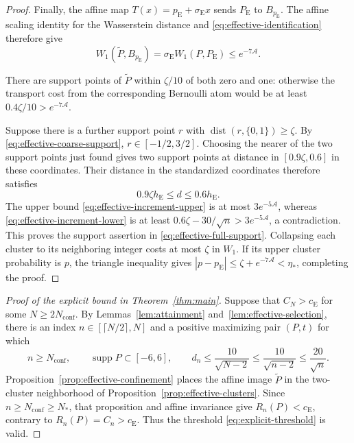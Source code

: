 \documentclass[aop]{imsart}
\theoremstyle{plain}
\theoremstyle{definition}
\theoremstyle{definition}
\newcommand{\ce}{c_{\mathrm E}}
\newcommand{\pe}{p_{\mathrm E}}
\newcommand{\se}{\sigma_{\mathrm E}}
\newcommand{\Pe}{P_{\mathrm E}}
\DeclareMathOperator{\supp}{supp}
\DeclareMathOperator{\dist}{dist}
\begin{document}
\begin{proof}
Finally, the affine map $T(x)=\pe+\se x$ sends $\Pe$ to
$B_{\pe}$.  The affine scaling identity for the Wasserstein distance
and \eqref{eq:effective-identification} therefore give
\[
 W_1(\widetilde P,B_{\pe})
 =\se W_1(P,\Pe)\le e^{-7\mathcal A}.
\]

There are support points of $\widetilde P$ within $\zeta/10$
of both zero and one: otherwise the transport cost from the
corresponding Bernoulli atom would be at least
$0.4\zeta/10>e^{-7\mathcal A}$.

Suppose there is a further support point $r$ with
$\dist(r,\{0,1\})\ge\zeta$.
By \eqref{eq:effective-coarse-support}, $r\in[-1/2,3/2]$.
Choosing the nearer of the two support points just found gives
two support points at distance in $[0.9\zeta,0.6]$ in these
coordinates.  Their distance in the standardized coordinates
therefore satisfies
\[
 0.9\zeta h_{\mathrm E}\le d\le0.6h_{\mathrm E}.
\]
The upper bound \eqref{eq:effective-increment-upper} is at most
$3e^{-5\mathcal A}$, whereas
\eqref{eq:effective-increment-lower} is at least
$0.6\zeta-30/\sqrt n>3e^{-5\mathcal A}$, a contradiction.
This proves the support assertion in
\eqref{eq:effective-full-support}.
Collapsing each cluster to its neighboring integer costs at most
$\zeta$ in $W_1$.  If its upper cluster probability is $p$,
the triangle inequality gives
$|p-\pe|\le\zeta+e^{-7\mathcal A}<\eta_*$, completing the proof.
\end{proof}

\begin{proof}[Proof of the explicit bound in Theorem~\ref{thm:main}]
Suppose that $C_N>\ce$ for some $N\ge2N_{\mathrm{conf}}$.
By Lemmas~\ref{lem:attainment} and~\ref{lem:effective-selection},
there is an index $n\in[\lceil N/2\rceil,N]$ and a positive
maximizing pair $(P,t)$ for which
\[
 n\ge N_{\mathrm{conf}},\qquad
 \supp P\subset[-6,6],\qquad
 d_n\le\frac{10}{\sqrt{N-2}}
       \le\frac{10}{\sqrt{n-2}}\le\frac{20}{\sqrt n}.
\]
Proposition~\ref{prop:effective-confinement} places the affine
image $\widetilde P$ in the two-cluster neighborhood of
Proposition~\ref{prop:effective-clusters}.
Since $n\ge N_{\mathrm{conf}}\ge N_*$, that proposition and
affine invariance give $R_n(P)<\ce$, contrary to $R_n(P)=C_n>\ce$.
Thus the threshold \eqref{eq:explicit-threshold} is valid.
\end{proof}
\end{document}

